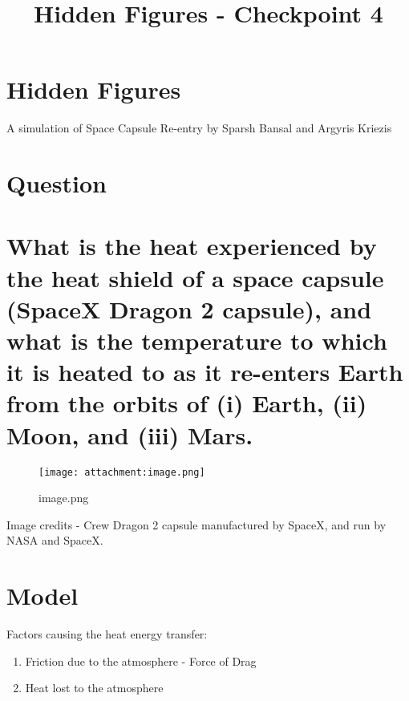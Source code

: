 \documentclass[11pt]{article}
\title{Hidden Figures - Checkpoint 4}
\makeatletter
\def\maxwidth{\ifdim\Gin@nat@width>\linewidth\linewidth
    \else\Gin@nat@width\fi}
\let\Oldincludegraphics\includegraphics
\renewcommand{\includegraphics}[1]{\Oldincludegraphics[width=.8\maxwidth]{#1}}
\providecommand{\tightlist}{%
      \setlength{\itemsep}{0pt}\setlength{\parskip}{0pt}}
\makeatother
\begin{document}
    
    
    \maketitle
    
    

    
    \hypertarget{hidden-figures}{%
\section{Hidden Figures}\label{hidden-figures}}

    A simulation of Space Capsule Re-entry by Sparsh Bansal and Argyris
Kriezis

    \hypertarget{question}{%
\section{Question}\label{question}}

    \hypertarget{what-is-the-heat-experienced-by-the-heat-shield-of-a-space-capsule-spacex-dragon-2-capsule-and-what-is-the-temperature-to-which-it-is-heated-to-as-it-re-enters-earth-from-the-orbits-of-i-earth-ii-moon-and-iii-mars.}{%
\section{What is the heat experienced by the heat shield of a space
capsule (SpaceX Dragon 2 capsule), and what is the temperature to which
it is heated to as it re-enters Earth from the orbits of (i) Earth, (ii)
Moon, and (iii)
Mars.}\label{what-is-the-heat-experienced-by-the-heat-shield-of-a-space-capsule-spacex-dragon-2-capsule-and-what-is-the-temperature-to-which-it-is-heated-to-as-it-re-enters-earth-from-the-orbits-of-i-earth-ii-moon-and-iii-mars.}}

    \begin{figure}
\centering
\texttt{[image: attachment:image.png]}
\caption{image.png}
\end{figure}

    Image credits - Crew Dragon 2 capsule manufactured by SpaceX, and run by
NASA and SpaceX.

    \hypertarget{model}{%
\section{Model}\label{model}}

    Factors causing the heat energy transfer:

\begin{enumerate}
\def\labelenumi{(\roman{enumi})}
\tightlist
\item
  Friction due to the atmosphere - Force of Drag
\item
  Heat lost to the atmosphere
\end{enumerate}
\end{document}

